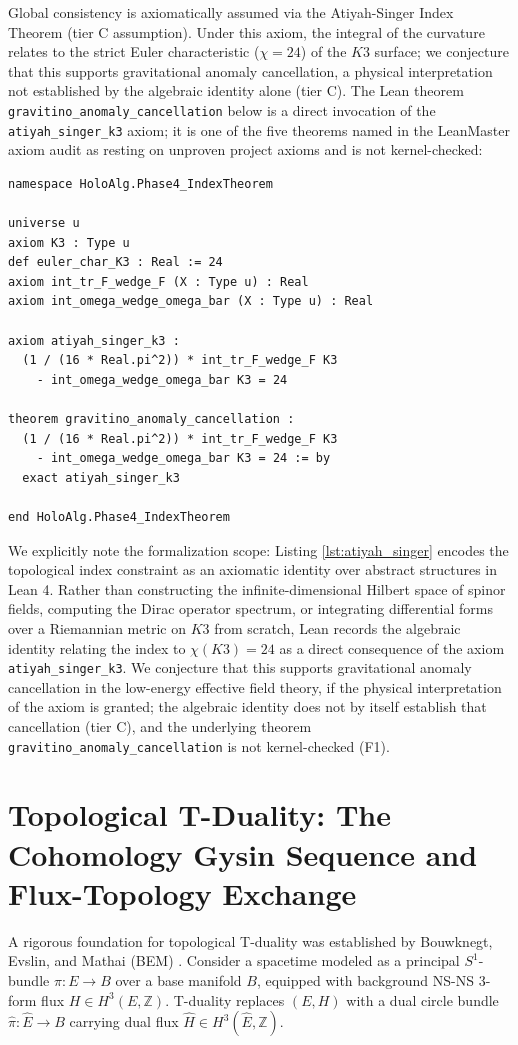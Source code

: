 \documentclass[11pt,a4paper]{article}
\begin{document}
Global consistency is axiomatically assumed via the Atiyah-Singer Index Theorem \cite{atiyah1968} (tier C assumption). Under this axiom, the integral of the curvature relates to the strict Euler characteristic ($\chi = 24$) of the $K3$ surface; we conjecture that this supports gravitational anomaly cancellation, a physical interpretation not established by the algebraic identity alone (tier C). The Lean theorem \texttt{gravitino\_anomaly\_cancellation} below is a direct invocation of the \texttt{atiyah\_singer\_k3} axiom; it is one of the five theorems named in the LeanMaster axiom audit as resting on unproven project axioms and is not kernel-checked:

\begin{lstlisting}[language=lean, caption={Lean 4 Axiomatization of the Atiyah-Singer Identity for K3}, label={lst:atiyah_singer}]
namespace HoloAlg.Phase4_IndexTheorem

universe u
axiom K3 : Type u
def euler_char_K3 : Real := 24
axiom int_tr_F_wedge_F (X : Type u) : Real
axiom int_omega_wedge_omega_bar (X : Type u) : Real

axiom atiyah_singer_k3 :
  (1 / (16 * Real.pi^2)) * int_tr_F_wedge_F K3
    - int_omega_wedge_omega_bar K3 = 24

theorem gravitino_anomaly_cancellation :
  (1 / (16 * Real.pi^2)) * int_tr_F_wedge_F K3
    - int_omega_wedge_omega_bar K3 = 24 := by
  exact atiyah_singer_k3

end HoloAlg.Phase4_IndexTheorem
\end{lstlisting}

We explicitly note the formalization scope: Listing \ref{lst:atiyah_singer} encodes the topological index constraint as an axiomatic identity over abstract structures in Lean 4. Rather than constructing the infinite-dimensional Hilbert space of spinor fields, computing the Dirac operator spectrum, or integrating differential forms over a Riemannian metric on $K3$ from scratch, Lean records the algebraic identity relating the index to $\chi(K3) = 24$ as a direct consequence of the axiom \texttt{atiyah\_singer\_k3}. We conjecture that this supports gravitational anomaly cancellation in the low-energy effective field theory, if the physical interpretation of the axiom is granted; the algebraic identity does not by itself establish that cancellation (tier C), and the underlying theorem \texttt{gravitino\_anomaly\_cancellation} is not kernel-checked (F1).

\section{Topological T-Duality: The Cohomology Gysin Sequence and Flux-Topology Exchange}
A rigorous foundation for topological T-duality was established by Bouwknegt, Evslin, and Mathai (BEM) \cite{bouwknegt2004, bunke2005}. Consider a spacetime modeled as a principal $S^1$-bundle $\pi: E \to B$ over a base manifold $B$, equipped with background NS-NS 3-form flux $H \in H^3(E, \mathbb{Z})$. T-duality replaces $(E, H)$ with a dual circle bundle $\hat{\pi}: \widehat{E} \to B$ carrying dual flux $\widehat{H} \in H^3(\widehat{E}, \mathbb{Z})$.
\end{document}
